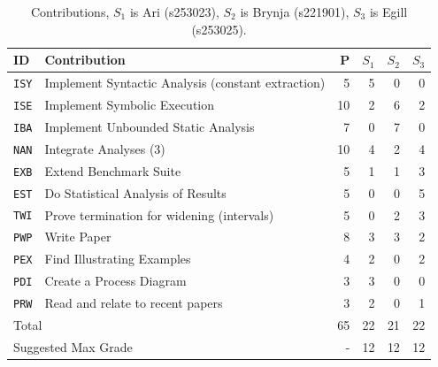 \documentclass[review, nonacm, acmsmall]{acmart}
\begin{document}
\begin{table}[ht]
    \centering
    \caption{Contributions, $S_1$ is Ari (s253023), $S_2$ is Brynja (s221901), $S_3$ is Egill (s253025).}
    \footnotesize
    \begin{tabular}{@{}llrrrr@{}} \toprule
         ID & Contribution & P & $S_1$ & $S_2$ & $S_3$ \\
         \midrule
         \texttt{ISY} & Implement Syntactic Analysis (constant extraction) & 5 & 5 & 0 & 0 \\
         \texttt{ISE} & Implement Symbolic Execution & 10 & 2 &  6 & 2 \\
         \texttt{IBA} & Implement Unbounded Static Analysis & 7 & 0 & 7 & 0 \\
         \texttt{NAN} & Integrate Analyses (3) & 10 & 4 & 2 & 4 \\
         \texttt{EXB} & Extend Benchmark Suite & 5 & 1 & 1 & 3 \\
         \texttt{EST} & Do Statistical Analysis of Results & 5 & 0 & 0 & 5 \\
         \texttt{TWI} & Prove termination for widening (intervals) & 5 & 0 & 2 & 3 \\
         \texttt{PWP} & Write Paper & 8 & 3 & 3 & 2 \\
         \texttt{PEX} & Find Illustrating Examples & 4 & 2 & 0 & 2 \\
         \texttt{PDI} & Create a Process Diagram & 3 & 3 & 0 & 0 \\
         \texttt{PRW} & Read and relate to recent papers & 3 & 2 & 0 & 1 \\
         \midrule
         \multicolumn{2}{l}{Total} & 65 & 22 & 21 & 22 \\
         \multicolumn{2}{l}{Suggested Max Grade} & - & 12 & 12 & 12 \\
         \bottomrule
    \end{tabular}
    \label{tab:contributions}
\end{table}



\end{document}
